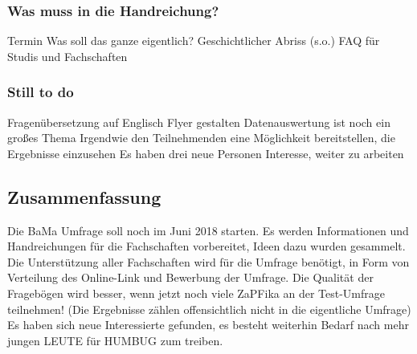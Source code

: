       \subsubsection*{Was muss in die Handreichung?}
        \begin{outline}
          \1 Termin
          \1 Was soll das ganze eigentlich?
          \1 Geschichtlicher Abriss (s.o.)
          \1 FAQ für Studis und Fachschaften
        \end{outline}

      \subsubsection*{Still to do}
        \begin{outline}
          \1 Fragenübersetzung auf Englisch
          \1 Flyer gestalten
          \1 Datenauswertung ist noch ein großes Thema
            \2 Irgendwie den Teilnehmenden eine Möglichkeit bereitstellen, die Ergebnisse einzusehen
          \1 Es haben drei neue Personen Interesse, weiter zu arbeiten
        \end{outline}

  \subsection*{Zusammenfassung}
    \begin{outline}
      \1 Die BaMa Umfrage soll noch im Juni 2018 starten.
      \1 Es werden Informationen und Handreichungen für die Fachschaften vorbereitet, Ideen dazu wurden gesammelt.
      \1 Die Unterstützung aller Fachschaften wird für die Umfrage benötigt, in Form von Verteilung des Online-Link und Bewerbung der Umfrage.
      \1 Die Qualität der Fragebögen wird besser, wenn jetzt noch viele ZaPFika an der Test-Umfrage teilnehmen! (Die Ergebnisse zählen offensichtlich nicht in die eigentliche Umfrage)
      \1 Es haben sich neue Interessierte gefunden, es besteht weiterhin Bedarf nach mehr jungen LEUTE für HUMBUG zum treiben.
    \end{outline}
